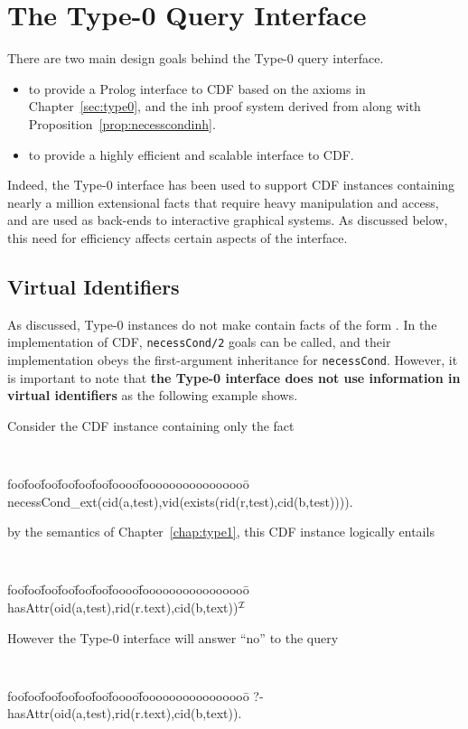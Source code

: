 \section{The Type-0 Query Interface} \label{sec:type0query}

There are two main design goals behind the Type-0 query interface.
\begin{itemize}
\item to provide a Prolog interface to CDF based on  
the axioms in Chapter~\ref{sec:type0}, and the {\sc inh} proof system
derived from  along with
Proposition~\ref{prop:necesscondinh}.
\item to provide a highly efficient and scalable interface to CDF.
\end{itemize}

Indeed, the Type-0 interface has been used to support CDF instances
containing nearly a million extensional facts that require heavy
manipulation and access, and are used as back-ends to interactive
graphical systems.  As discussed below, this need for efficiency
affects certain aspects of the interface.

\subsection{Virtual Identifiers}
As discussed, Type-0 instances do not make contain facts of the form
.  In the implementation of CDF, {\tt necessCond/2}
goals can be called, and their implementation obeys the first-argument
inheritance for {\tt necessCond}.  However, it is important to note
that {\bf the Type-0 interface does not use information in virtual
identifiers} as the following example shows.

\begin{example} \rm 
Consider the CDF instance containing only the fact
{\small 
{\tt 
\begin{tabbing}
foo\=foo\=foo\=foo\=foo\=foo\=foooo\=foooooooooooooooo\=\kill
\> necessCond\_ext(cid(a,test),vid(exists(rid(r,test),cid(b,test)))).
\end{tabbing} } } 
%
\noindent
by the semantics of Chapter~\ref{chap:type1}, this CDF instance
logically entails {\small {\tt
\begin{tabbing}
foo\=foo\=foo\=foo\=foo\=foo\=foooo\=foooooooooooooooo\=\kill
\> hasAttr(oid(a,test),rid(r.text),cid(b,text))$^{{\cal I}}$
\end{tabbing} } } 
%
\noindent
However the Type-0 interface will answer ``no'' to the query 
{\small 
{\tt 
\begin{tabbing}
foo\=foo\=foo\=foo\=foo\=foo\=foooo\=foooooooooooooooo\=\kill
\> ?- hasAttr(oid(a,test),rid(r.text),cid(b,text)).
\end{tabbing} } } 
%
\end{example}

